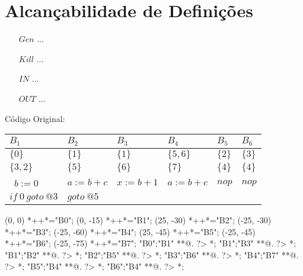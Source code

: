 \section{Alcan\c{c}abilidade de Defini\c{c}\~oes}

\begin{itemize}
  \item[$Gen$] ...
  \item[$Kill$] ...
  \item[$IN$] ...
  \item[$OUT$] ...
\end{itemize}

C\'odigo Original:

\begin{table}[ht]
\begin{scriptsize}
\begin{tabular}{l|l|l|l|l|l}
$B_{1}$ & $B_{2}$ & $B_{3}$ & $B_{4}$ & $B_{5}$ & $B_{6}$ \\
\hline
$\{0\}$ & $\{1\}$ & $\{1\}$ & $\{5, 6\}$ & $\{2\}$ & $\{3\}$ \\
$\{3, 2\}$ & $\{5\}$ & $\{6\}$ & $\{7\}$ & $\{4\}$ & $\{4\}$ \\
\hline\
$b:=0$ & $a:=b+c$ & $x:=b+1$ & $a:=b+c$ & $nop$ & $nop$ \\
$if\:0\:goto\:@3$ & $goto\:@5$ &  &  &  &  \\
\end{tabular}
\end{scriptsize}
\end{table}

\begin{scriptsize}
\xy(0, 0)
	*++{}*\frm{-,}="B0";
(0, -15)
	*++{}*\frm{-,}="B1";
(25, -30)
	*++{}*\frm{-,}="B2";
(-25, -30)
	*++{}*\frm{-,}="B3";
(-25, -60)
	*++{}*\frm{-,}="B4";
(25, -45)
	*++{}*\frm{-,}="B5";
(-25, -45)
	*++{}*\frm{-,}="B6";
(-25, -75)
	*++{}*\frm{-,}="B7";
"B0";"B1" **@{.} ?> *{\dir{>}};
"B1";"B3" **@{.} ?> *{\dir{>}};
"B1";"B2" **@{.} ?> *{\dir{>}};
"B2";"B5" **@{.} ?> *{\dir{>}};
"B3";"B6" **@{.} ?> *{\dir{>}};
"B4";"B7" **@{.} ?> *{\dir{>}};
"B5";"B4" **@{.} ?> *{\dir{>}};
"B6";"B4" **@{.} ?> *{\dir{>}};
\endxy
\end{scriptsize}


